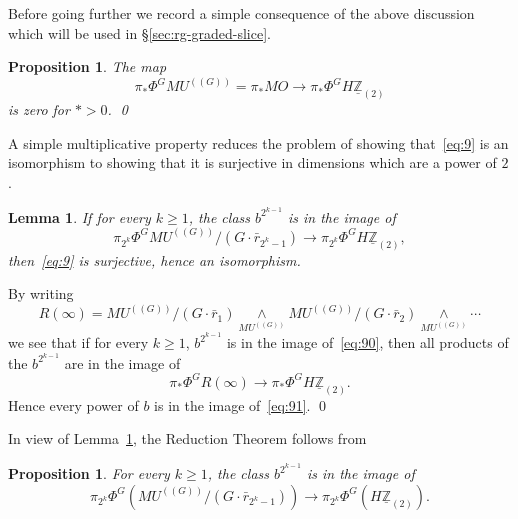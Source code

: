 \documentclass{amsart}
\newtheorem{lem}[equation]{Lemma}
\newtheorem{prop}[equation]{Proposition}
\theoremstyle{definition}
\theoremstyle{remark}
\newenvironment{pf}{\bigskip{\em Proof:\/}}{\qed\medskip}
\newcommand{\Z}{{\mathbb Z}}
\newcommand{\mutn}[1]{MU^{(\!(#1)\!)}}
\newcommand{\smashove}[1]{\underset{#1}{\wedge}}
\newcommand{\gfp}[1]{\Phi^{#1}}
\newcommand{\phig}{\gfp{G}}
\newcommand{\zltm}{\underline{\Z}_{(2)}}
\newcommand{\gbar}{\bar}
\newcommand{\rr}{\gbar{r}}
\begin{document}
Before going further we record a simple consequence of the above
discussion which will be used in \S\ref{sec:rg-graded-slice}.

\begin{prop}
\label{thm:72}
The map
\[
\pi_{\ast}\phig\mutn{G} =\pi_{\ast}MO\to
\pi_{\ast}\phig H\zltm
\]
is zero for $\ast>0$.  
\qed
\end{prop}

A simple multiplicative property reduces the problem of showing
that~\eqref{eq:9} is an isomorphism to showing that it is surjective
in dimensions which are a power of $2$.

\begin{lem}
\label{thm:181}
If for every $k\ge 1$, the class $b^{2^{k-1}}$ is in the image of
\begin{equation}\label{eq:90}
\pi_{2^{k}}\phig \mutn{G}/(G\cdot\rr_{2^{k}-1}) \to \pi_{2^{k}}\phig H\zltm,
\end{equation}
then~\eqref{eq:9} is surjective, hence an isomorphism.
\end{lem}

\begin{pf}
By writing
\[
R(\infty) = \mutn{G}/(G\cdot\rr_{1})\smashove{\mutn{G}}
\mutn{G}/(G\cdot\rr_{2})\smashove{\mutn{G}}\cdots
\]
we see that if for every $k\ge 1$, $b^{2^{k-1}}$ is in the image
of~\eqref{eq:90}, then all products of the $b^{2^{k-1}}$ are in the
image of
\begin{equation}\label{eq:91}
\pi_{\ast}\phig R(\infty)\to \pi_{\ast}\phig H\zltm.
\end{equation}
Hence every power of $b$ is in the image of~\eqref{eq:91}.
\end{pf}

In view of Lemma~\ref{thm:181}, the Reduction Theorem follows from
\begin{prop}
\label{thm:182}
For every $k\ge 1$, the class $b^{2^{k-1}}$ is in the image of
\[
\pi_{2^{k}}\phig(\mutn{G}/(G\cdot\rr_{2^{k}-1})) \to \pi_{2^{k}}\phig(H\zltm).
\]
\end{prop}
\end{document}

